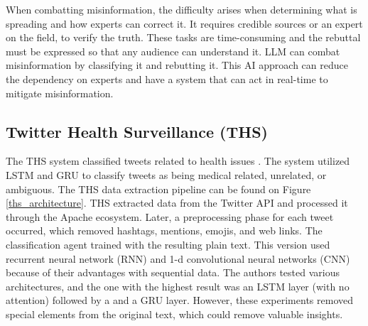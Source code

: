 When combatting misinformation, the difficulty arises when determining what is spreading and how experts can correct it. It requires  credible sources or an expert on the field, to verify the truth.
These tasks are time-consuming and the rebuttal
must be expressed so that any audience can understand it. 
LLM can combat misinformation by classifying it and rebutting it. 
This AI approach can reduce the dependency on experts and have a system that can act in real-time to mitigate misinformation.


\subsection{Twitter Health Surveillance (THS)}
The THS system classified tweets related to health issues \cite{8622504,9581175}. The system utilized LSTM and GRU to classify tweets as being medical related, unrelated, or ambiguous.  The THS
data extraction pipeline can be found on Figure \ref{ths_architecture}. THS extracted data from the Twitter API and processed it through the Apache ecosystem. Later, a preprocessing phase
for each tweet occurred, which removed hashtags, mentions, emojis, and web links. The classification agent trained with the resulting plain text. This version used recurrent neural network (RNN) and
1-d convolutional neural networks (CNN) because of their advantages with sequential data. The authors tested various  architectures, and the one with the highest result was an LSTM layer (with no attention) followed by a
and a GRU layer.  
However, these experiments removed special elements from the original text,  %
which could remove valuable insights. 

